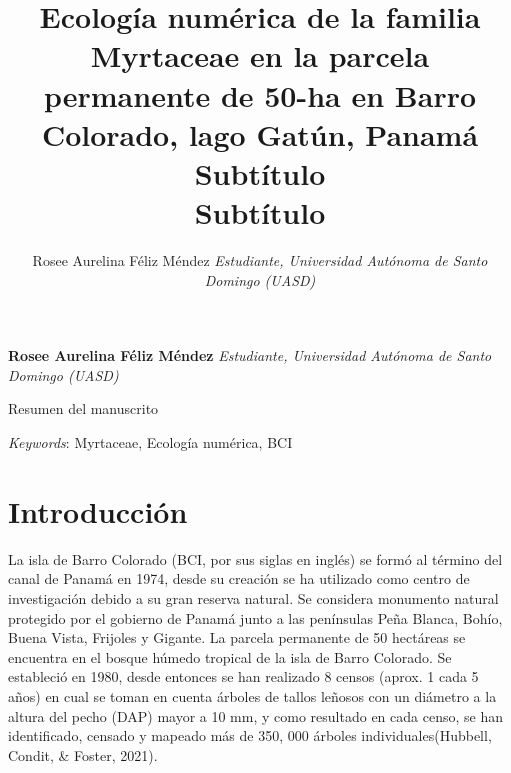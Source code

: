 \documentclass[11pt,]{article}
\title{Ecología numérica de la familia Myrtaceae en la parcela permanente de
50-ha en Barro Colorado, lago Gatún, Panamá\\
Subtítulo\\
Subtítulo  }
\author{\Large Rosee Aurelina Féliz Méndez\vspace{0.05in} \newline\normalsize\emph{Estudiante, Universidad Autónoma de Santo Domingo (UASD)}  }
\date{}
\newcommand*{\authorfont}{\fontfamily{phv}\selectfont}
\renewenvironment{abstract}
 {{%
    \setlength{\leftmargin}{0mm}
    \setlength{\rightmargin}{\leftmargin}%
  }%
  \relax}
 {\endlist}
\begin{document}
	
%

{%
\setlength{\parindent}{0pt}
\thispagestyle{plain}
{\fontsize{18}{20}\selectfont\raggedright 
\maketitle  %

}

{
   \vskip 13.5pt\relax \normalsize\fontsize{11}{12} 
\textbf{\authorfont Rosee Aurelina Féliz Méndez} \hskip 15pt \emph{\small Estudiante, Universidad Autónoma de Santo Domingo (UASD)}   

}

}








\begin{abstract}

    \hbox{\vrule height .2pt width 39.14pc}

    \vskip 8.5pt %

\noindent Resumen del manuscrito


\vskip 8.5pt \noindent \emph{Keywords}: Myrtaceae, Ecología numérica, BCI \par

    \hbox{\vrule height .2pt width 39.14pc}



\end{abstract}


\vskip 6.5pt


\noindent  \section{Introducción}\label{introducciuxf3n}

La isla de Barro Colorado (BCI, por sus siglas en inglés) se formó al
término del canal de Panamá en 1974, desde su creación se ha utilizado
como centro de investigación debido a su gran reserva natural. Se
considera monumento natural protegido por el gobierno de Panamá junto a
las penínsulas Peña Blanca, Bohío, Buena Vista, Frijoles y Gigante. La
parcela permanente de 50 hectáreas se encuentra en el bosque húmedo
tropical de la isla de Barro Colorado. Se estableció en 1980, desde
entonces se han realizado 8 censos (aprox. 1 cada 5 años) en cual se
toman en cuenta árboles de tallos leñosos con un diámetro a la altura
del pecho (DAP) mayor a 10 mm, y como resultado en cada censo, se han
identificado, censado y mapeado más de 350, 000 árboles
individuales(Hubbell, Condit, \& Foster, 2021).
\end{document}
